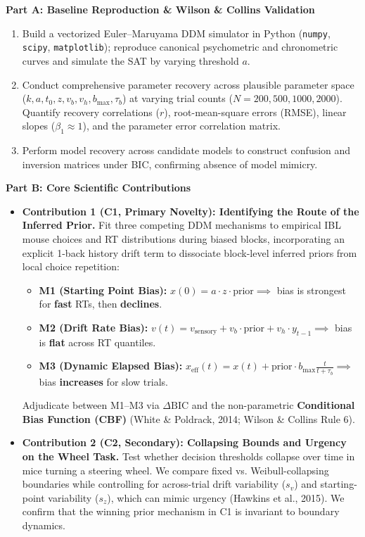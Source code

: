 \documentclass[10pt,a4paper]{article}
\begin{document}
\noindent\textbf{Part A: Baseline Reproduction \& Wilson \& Collins Validation}
\begin{enumerate}
    \item Build a vectorized Euler--Maruyama DDM simulator in Python (\texttt{numpy}, \texttt{scipy}, \texttt{matplotlib}); reproduce canonical psychometric and chronometric curves and simulate the SAT by varying threshold $a$.
    \item Conduct comprehensive parameter recovery across plausible parameter space ($k, a, t_0, z, v_b, v_h, b_{\max}, \tau_b$) at varying trial counts ($N = 200, 500, 1000, 2000$). Quantify recovery correlations ($r$), root-mean-square errors (RMSE), linear slopes ($\beta_1 \approx 1$), and the parameter error correlation matrix.
    \item Perform model recovery across candidate models to construct confusion and inversion matrices under BIC, confirming absence of model mimicry.
\end{enumerate}

\vspace{0.4em}
\noindent\textbf{Part B: Core Scientific Contributions}
\begin{itemize}
    \item \textbf{Contribution 1 (C1, Primary Novelty): Identifying the Route of the Inferred Prior.} Fit three competing DDM mechanisms to empirical IBL mouse choices and RT distributions during biased blocks, incorporating an explicit 1-back history drift term to dissociate block-level inferred priors from local choice repetition:
    \begin{itemize}
        \item \textbf{M1 (Starting Point Bias):} $x(0) = a \cdot z \cdot \text{prior} \implies$ bias is strongest for \textbf{fast} RTs, then \textbf{declines}.
        \item \textbf{M2 (Drift Rate Bias):} $v(t) = v_{\text{sensory}} + v_b \cdot \text{prior} + v_h \cdot y_{t-1} \implies$ bias is \textbf{flat} across RT quantiles.
        \item \textbf{M3 (Dynamic Elapsed Bias):} $x_{\text{eff}}(t) = x(t) + \text{prior} \cdot b_{\max} \frac{t}{t + \tau_b} \implies$ bias \textbf{increases} for slow trials.
    \end{itemize}
    Adjudicate between M1--M3 via $\Delta\text{BIC}$ and the non-parametric \textbf{Conditional Bias Function (CBF)} (White \& Poldrack, 2014; Wilson \& Collins Rule 6).
    \item \textbf{Contribution 2 (C2, Secondary): Collapsing Bounds and Urgency on the Wheel Task.} Test whether decision thresholds collapse over time in mice turning a steering wheel. We compare fixed vs. Weibull-collapsing boundaries while controlling for across-trial drift variability ($s_v$) and starting-point variability ($s_z$), which can mimic urgency (Hawkins et al., 2015). We confirm that the winning prior mechanism in C1 is invariant to boundary dynamics.
\end{itemize}
\end{document}
